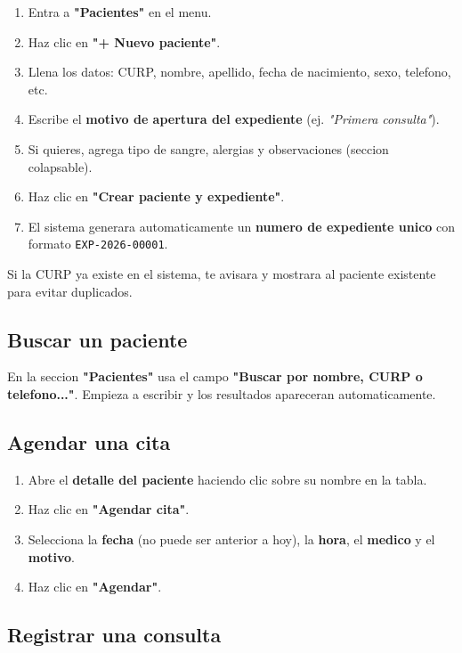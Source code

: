 \documentclass[11pt,a4paper]{article}
\begin{document}
\begin{enumerate}
    \item Entra a \textbf{"Pacientes"} en el menu.
    \item Haz clic en \textbf{"+ Nuevo paciente"}.
    \item Llena los datos: CURP, nombre, apellido, fecha de nacimiento, sexo, telefono, etc.
    \item Escribe el \textbf{motivo de apertura del expediente} (ej. \textit{"Primera consulta"}).
    \item Si quieres, agrega tipo de sangre, alergias y observaciones (seccion colapsable).
    \item Haz clic en \textbf{"Crear paciente y expediente"}.
    \item El sistema generara automaticamente un \textbf{numero de expediente unico} con formato \texttt{EXP-2026-00001}.
\end{enumerate}

\begin{cajaTip}
    Si la CURP ya existe en el sistema, te avisara y mostrara al paciente existente para evitar duplicados.
\end{cajaTip}

\subsection{Buscar un paciente}

En la seccion \textbf{"Pacientes"} usa el campo \textbf{"Buscar por nombre, CURP o telefono..."}. Empieza a escribir y los resultados apareceran automaticamente.

\subsection{Agendar una cita}

\begin{enumerate}
    \item Abre el \textbf{detalle del paciente} haciendo clic sobre su nombre en la tabla.
    \item Haz clic en \textbf{"Agendar cita"}.
    \item Selecciona la \textbf{fecha} (no puede ser anterior a hoy), la \textbf{hora}, el \textbf{medico} y el \textbf{motivo}.
    \item Haz clic en \textbf{"Agendar"}.
\end{enumerate}

\subsection{Registrar una consulta}
\end{document}
